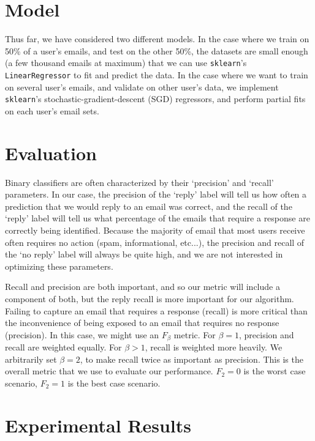 \documentclass[10pt]{article}
\begin{document}
\section*{Model}

Thus far, we have considered two different models. In the case where we train on 50\% of a user's emails, and test on the other 50\%, the datasets are small enough (a few thousand emails at maximum) that we can use \texttt{sklearn}'s \texttt{LinearRegressor} to fit and predict the data. In the case where we want to train on several user's emails, and validate on other user's data, we implement \texttt{sklearn}'s stochastic-gradient-descent (SGD) regressors, and perform partial fits on each user's email sets.

\section*{Evaluation}

Binary classifiers are often characterized by their `precision' and `recall' parameters. In our case, the precision of the `reply' label will tell us how often a prediction that we would reply to an email was correct, and the recall of the `reply' label will tell us what percentage of the emails that require a response are correctly being identified. Because the majority of email that most users receive often requires no action (spam, informational, etc...), the precision and recall of the `no reply' label will always be quite high, and we are not interested in optimizing these parameters.

Recall and precision are both important, and so our metric will include a component of both, but the reply recall is more important for our algorithm. Failing to capture an email that requires a response (recall) is more critical than the inconvenience of being exposed to an email that requires no response (precision). In this case, we might use an $F_\beta$ metric\cite{fbetawikipedia}. For $\beta = 1$, precision and recall are weighted equally. For $\beta > 1$, recall is weighted more heavily. We arbitrarily set $\beta = 2$, to make recall twice as important as precision. This is the overall metric that we use to evaluate our performance. $F_2 = 0$ is the worst case scenario, $F_2 = 1$ is the best case scenario.

\section*{Experimental Results}
\end{document}
